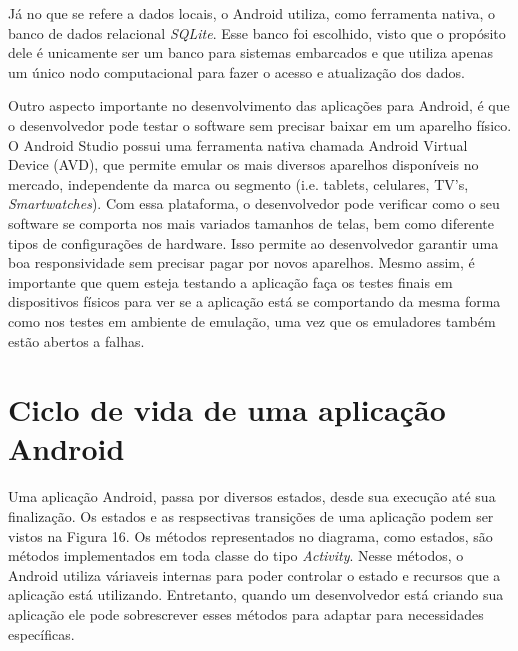 \documentclass[
    12pt,       %
    openright,      %
    twoside,      %
    a4paper,      %
    english,      %
    french,       %
    spanish,      %
    brazil,       %
    ]{abntex2}
\begin{document}
        Já no que se refere a dados locais, o Android utiliza, como ferramenta nativa, o banco de
        dados relacional \textit{SQLite}. Esse banco foi escolhido, visto que o propósito dele é
        unicamente ser um banco para sistemas embarcados e que utiliza apenas um único nodo
        computacional para fazer o acesso e atualização dos dados.

        Outro aspecto importante no desenvolvimento das aplicações para Android, é que o
        desenvolvedor pode testar o software sem precisar baixar em um aparelho
        físico. O Android Studio possui uma ferramenta nativa chamada Android Virtual
        Device (AVD), que permite emular os mais diversos aparelhos disponíveis no
        mercado, independente da marca ou segmento (i.e. tablets, celulares, TV's,
        \textit{Smartwatches}). Com essa plataforma, o desenvolvedor pode verificar como o seu
        software se comporta nos mais variados tamanhos de telas, bem como diferente
        tipos de configurações de hardware. Isso permite ao desenvolvedor garantir
        uma boa responsividade sem precisar pagar por novos aparelhos. Mesmo assim,
        é importante que quem esteja testando a aplicação faça os testes finais em
        dispositivos físicos para ver se a aplicação está se comportando da mesma
        forma como nos testes em ambiente de emulação, uma vez que os emuladores
        também estão abertos a falhas.

      \section{Ciclo de vida de uma aplicação Android}
        Uma aplicação Android, passa por diversos estados, desde sua execução até sua finalização.
        Os estados e as respsectivas transições de uma aplicação podem ser vistos na Figura 16. Os
        métodos representados no diagrama, como estados, são métodos implementados em toda classe
        do tipo \textit{Activity}. Nesse métodos, o Android utiliza váriaveis internas para poder
        controlar o estado e recursos que a aplicação está utilizando. Entretanto, quando um
        desenvolvedor está criando sua aplicação ele pode sobrescrever esses métodos para adaptar
        para necessidades específicas.
\end{document}
